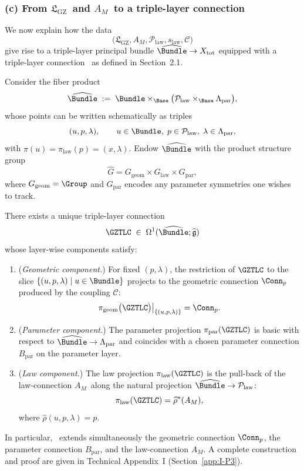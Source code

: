 \documentclass[11pt]{book}
\theoremstyle{plain}
\theoremstyle{definition}
\newcommand{\GZLS}{\ensuremath{\mathfrak{L}_{\mathrm{GZ}}}}       \newcommand{\GZLT}{\ensuremath{M_{!w}}}                           \newcommand{\GZLOC}{\ensuremath{A_M}}                             \newcommand{\GZLCurv}{\ensuremath{\mathcal{F}_{\mathrm{law}}}}
\begin{document}
\subsubsection*{(c) From \GZLS\ and \GZLOC\ to a triple-layer connection}

We now explain how the data
\[
  \bigl(\GZLS,\GZLOC,\mathcal{P}_{\mathrm{law}},s_{\mathrm{law}},\mathcal{C}\bigr)
\]
give rise to a triple-layer principal bundle
$\widehat{\Bundle}\to X_{\mathrm{tot}}$ equipped with a triple-layer
connection \GZTLC\ as defined in Section~2.1.

Consider the fiber product
\[
   \widehat{\Bundle}
   \;:=\;
   \Bundle
   \times_{\Base}
   \bigl(\mathcal{P}_{\mathrm{law}}\times_{\Base}\Lambda_{\mathrm{par}}\bigr),
\]
whose points can be written schematically as triples
\[
   (u,p,\lambda),
   \qquad
   u\in\Bundle,\;
   p\in\mathcal{P}_{\mathrm{law}},\;
   \lambda\in\Lambda_{\mathrm{par}},
\]
with $\pi(u)=\pi_{\mathrm{law}}(p)=(x,\lambda)$.
Endow $\widehat{\Bundle}$ with the product structure group
\[
   \widehat{G}
   =
   G_{\mathrm{geom}}\times G_{\mathrm{law}}\times G_{\mathrm{par}},
\]
where $G_{\mathrm{geom}}=\Group$ and $G_{\mathrm{par}}$ encodes any
parameter symmetries one wishes to track.

\begin{proposition}
There exists a unique triple-layer connection
  \[
     \GZTLC
     \;\in\;
     \Omega^1(\widehat{\Bundle};\widehat{\mathfrak{g}})
  \]
  whose layer-wise components satisfy:
  \begin{enumerate}[label=\roman*)]
    \item (\emph{Geometric component.})
          For fixed $(p,\lambda)$, the restriction of
          $\GZTLC$ to the slice
          $\{(u,p,\lambda)\mid u\in\Bundle\}$ projects to the
          geometric connection $\Conn_p$ produced by the coupling
          $\mathcal{C}$:
          \[
             \pi_{\mathrm{geom}}\bigl(\GZTLC\bigr)
             \big|_{\{(u,p,\lambda)\}}
             = \Conn_p.
          \]
    \item (\emph{Parameter component.})
          The parameter projection
          $\pi_{\mathrm{par}}(\GZTLC)$ is basic with respect to
          $\widehat{\Bundle}\to\Lambda_{\mathrm{par}}$ and coincides
          with a chosen parameter connection $B_{\mathrm{par}}$ on
          the parameter layer.
    \item (\emph{Law component.})
          The law projection $\pi_{\mathrm{law}}(\GZTLC)$ is the pull-back
          of the law-connection \GZLOC\ along the natural projection
          $\widehat{\Bundle}\to\mathcal{P}_{\mathrm{law}}$:
          \[
             \pi_{\mathrm{law}}(\GZTLC)
             =
             \widehat{\rho}^*(\GZLOC),
          \]
          where $\widehat{\rho}(u,p,\lambda)=p$.
  \end{enumerate}
  In particular, \GZTLC\ extends simultaneously the geometric
  connection $\Conn_p$, the parameter connection $B_{\mathrm{par}}$,
  and the law-connection \GZLOC.
  A complete construction and proof are given in Technical Appendix~I
  (Section~\ref{app:I-P3}).
\end{proposition}
\end{document}
